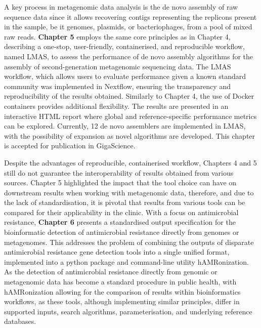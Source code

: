 A key process in metagenomic data analysis is the de novo assembly of raw sequence data since it allows recovering contigs representing the replicons present in the sample, be it genomes, plasmids, or bacteriophages, from a pool of mixed raw reads. \textbf{Chapter 5} employs the same core principles as in Chapter 4, describing a one-stop, user-friendly, containerised, and reproducible workflow, named LMAS, to assess the performance of de novo assembly algorithms for the assembly of second-generation metagenomic sequencing data. The LMAS workflow, which allows users to evaluate performance given a known standard community was implemented in Nextflow, ensuring the transparency and reproducibility of the results obtained. Similarly to Chapter 4, the use of Docker containers provides additional flexibility. The results are presented in an interactive HTML report where global and reference-specific performance metrics can be explored. Currently, 12 de novo assemblers are implemented in LMAS, with the possibility of expansion as novel algorithms are developed. This chapter is accepted for publication in GigaScience.

Despite the advantages of reproducible, containerised workflow, Chapters 4 and 5 still do not guarantee the interoperability of results obtained from various sources. Chapter 5 highlighted the impact that the tool choice can have on downstream results when working with metagenomic data, therefore, and due to the lack of standardisation, it is pivotal that results from various tools can be compared for their applicability in the clinic. With a focus on antimicrobial resistance, \textbf{Chapter 6} presents a standardised output specification for the bioinformatic detection of antimicrobial resistance directly from genomes or metagenomes. This addresses the problem of combining the outputs of disparate antimicrobial resistance gene detection tools into a single unified format, implemented into a python package and command-line utility hAMRonization. As the detection of antimicrobial resistance directly from genomic or metagenomic data has become a standard procedure in public health, with hAMRonization allowing for the comparison of results within bioinformatics workflows, as these tools, although implementing similar principles, differ in supported inputs, search algorithms, parameterisation, and underlying reference databases. 

